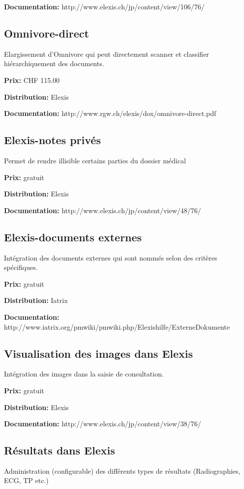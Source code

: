 \documentclass[paper=a4,BCOR8.25mm]{scrartcl}
\begin{document}
\textbf{Documentation:} http://www.elexis.ch/jp/content/view/106/76/

\subsection{Omnivore-direct}
Elargissement d'Omnivore qui peut directement scanner et classifier hiérarchiquement des documents.

\textbf{Prix:} CHF 115.00

\textbf{Distribution:} Elexis

\textbf{Documentation:} http://www.rgw.ch/elexis/dox/omnivore-direct.pdf

\subsection{Elexis-notes privés}
Permet de rendre illisible certains parties du dossier médical

\textbf{Prix:} gratuit

\textbf{Distribution:} Elexis

\textbf{Documentation:} http://www.elexis.ch/jp/content/view/48/76/


\subsection{Elexis-documents externes}
Intégration des documents externes qui sont nommés selon des critères spécifiques.

\textbf{Prix:} gratuit

\textbf{Distribution:} Iatrix

\textbf{Documentation:} http://www.iatrix.org/pmwiki/pmwiki.php/Elexishilfe/ExterneDokumente

\subsection{Visualisation des images dans Elexis}
Intégration des images dans la saisie de consultation.

\textbf{Prix:} gratuit

\textbf{Distribution:} Elexis

\textbf{Documentation:} http://www.elexis.ch/jp/content/view/38/76/

\subsection{Résultats dans Elexis}
Administration (configurable) des différents types de résultats (Radiographies, ECG, TP etc.)
\end{document}
